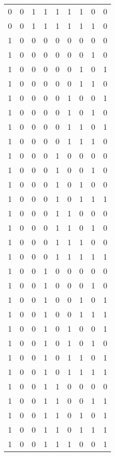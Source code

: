 \begin{longtable}[c]{rrrrrrrrr}
        0 & 0 & 1 & 1 & 1 & 1 & 1 & 0 & 0 \\
        0 & 0 & 1 & 1 & 1 & 1 & 1 & 1 & 0 \\
        1 & 0 & 0 & 0 & 0 & 0 & 0 & 0 & 0 \\
        1 & 0 & 0 & 0 & 0 & 0 & 0 & 1 & 0 \\
        1 & 0 & 0 & 0 & 0 & 0 & 1 & 0 & 1 \\
        1 & 0 & 0 & 0 & 0 & 0 & 1 & 1 & 0 \\
        1 & 0 & 0 & 0 & 0 & 1 & 0 & 0 & 1 \\
        1 & 0 & 0 & 0 & 0 & 1 & 0 & 1 & 0 \\
        1 & 0 & 0 & 0 & 0 & 1 & 1 & 0 & 1 \\
        1 & 0 & 0 & 0 & 0 & 1 & 1 & 1 & 0 \\
        1 & 0 & 0 & 0 & 1 & 0 & 0 & 0 & 0 \\
        1 & 0 & 0 & 0 & 1 & 0 & 0 & 1 & 0 \\
        1 & 0 & 0 & 0 & 1 & 0 & 1 & 0 & 0 \\
        1 & 0 & 0 & 0 & 1 & 0 & 1 & 1 & 1 \\
        1 & 0 & 0 & 0 & 1 & 1 & 0 & 0 & 0 \\
        1 & 0 & 0 & 0 & 1 & 1 & 0 & 1 & 0 \\
        1 & 0 & 0 & 0 & 1 & 1 & 1 & 0 & 0 \\
        1 & 0 & 0 & 0 & 1 & 1 & 1 & 1 & 1 \\
        1 & 0 & 0 & 1 & 0 & 0 & 0 & 0 & 0 \\
        1 & 0 & 0 & 1 & 0 & 0 & 0 & 1 & 0 \\
        1 & 0 & 0 & 1 & 0 & 0 & 1 & 0 & 1 \\
        1 & 0 & 0 & 1 & 0 & 0 & 1 & 1 & 1 \\
        1 & 0 & 0 & 1 & 0 & 1 & 0 & 0 & 1 \\
        1 & 0 & 0 & 1 & 0 & 1 & 0 & 1 & 0 \\
        1 & 0 & 0 & 1 & 0 & 1 & 1 & 0 & 1 \\
        1 & 0 & 0 & 1 & 0 & 1 & 1 & 1 & 1 \\
        1 & 0 & 0 & 1 & 1 & 0 & 0 & 0 & 0 \\
        1 & 0 & 0 & 1 & 1 & 0 & 0 & 1 & 1 \\
        1 & 0 & 0 & 1 & 1 & 0 & 1 & 0 & 1 \\
        1 & 0 & 0 & 1 & 1 & 0 & 1 & 1 & 1 \\
        1 & 0 & 0 & 1 & 1 & 1 & 0 & 0 & 1 \\

\end{longtable}
